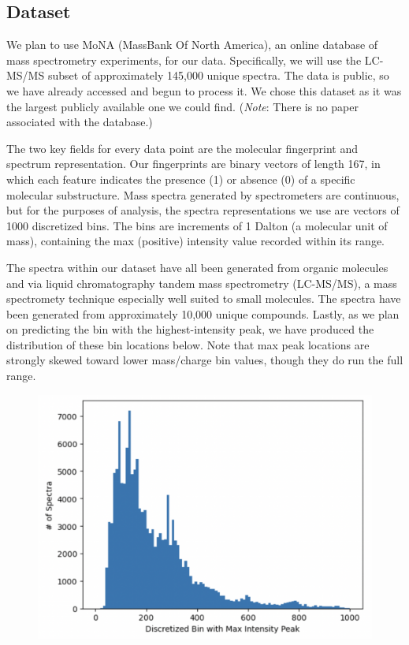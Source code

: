 \documentclass{article}
\begin{document}
\subsection{Dataset}
We plan to use MoNA (MassBank Of North America), an online database of mass spectrometry experiments, for our data. Specifically, we will use the LC-MS/MS subset of approximately 145,000 unique spectra. The data is public, so we have already accessed and begun to process it. We chose this dataset as it was the largest publicly available one we could find. (\textit{Note}: There is no paper associated with the database.)

The two key fields for every data point are the molecular fingerprint and spectrum representation. Our fingerprints are binary vectors of length 167, in which each feature indicates the presence (1) or absence (0) of a specific molecular substructure. Mass spectra generated by spectrometers are continuous, but for the purposes of analysis, the spectra representations we use are vectors of 1000 discretized bins. The bins are increments of 1 Dalton (a molecular unit of mass), containing the max (positive) intensity value recorded within its range.

The spectra within our dataset have all been generated from organic molecules and via liquid chromatography tandem mass spectrometry (LC-MS/MS), a mass spectromety technique especially well suited to small molecules. The spectra have been generated from approximately 10,000 unique compounds. Lastly, as we plan on predicting the bin with the highest-intensity peak, we have produced the distribution of these bin locations below. Note that max peak locations are strongly skewed toward lower mass/charge bin values, though they do run the full range.
\begin{figure}[H]
  \centering
  \centerline{\includegraphics[scale=0.35]{maxbin_hist.png}}
\end{figure}
\end{document}
